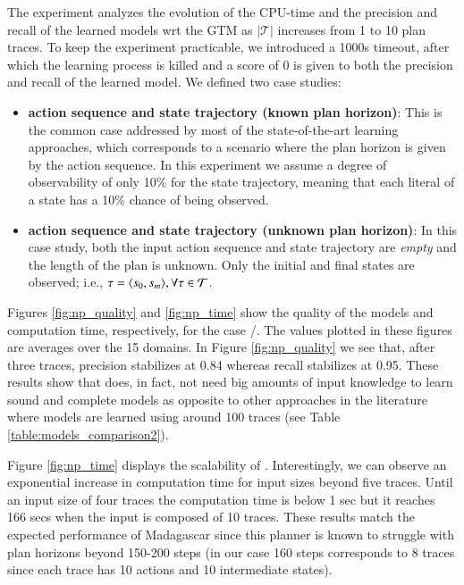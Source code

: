 The experiment analyzes the evolution of the CPU-time and the precision and recall of the learned models wrt the GTM as $|\mathcal{T}|$ increases from 1 to 10 plan traces. To keep the experiment practicable, we introduced a 1000s timeout, after which the learning process is killed and a score of $0$ is given to both the precision and recall of the learned model. We defined two case studies:

\begin{itemize}
	\item \textbf{\FO action sequence and \PO state trajectory (known plan horizon)}: This is the common case addressed by most of the state-of-the-art learning approaches, which corresponds to a scenario where the plan horizon is given by the action sequence. In this experiment we assume a degree of observability of only 10\% for the state trajectory, meaning that each literal of a state has a 10\% chance of being observed.
	\item  \textbf{\NO action sequence and \NO state trajectory (unknown plan horizon)}: In this case study, both the input action sequence and state trajectory are {\em empty} and the length of the plan is unknown. Only the initial and final states are observed; i.e., $\tau = {\langle s_0, s_m \rangle}, \forall \tau \in \mathcal{T}$.
\end{itemize}

Figures \ref{fig:np_quality} and \ref{fig:np_time} show the quality of the models and computation time, respectively, for the case \FO/\PO. The values plotted in these figures are averages over the 15 domains. In Figure \ref{fig:np_quality} we see that, after three traces, precision stabilizes at 0.84 whereas recall stabilizes at 0.95. These results show that \FAMA does, in fact, not need big amounts of input knowledge to learn sound and complete models as opposite to other approaches in the literature where models are learned using around 100 traces (see Table \ref{table:models_comparison2}).

Figure \ref{fig:np_time} displays the scalability of \FAMA. Interestingly, we can observe an exponential increase in computation time for input sizes beyond five traces. Until an input size of four traces the computation time is below 1 sec but it reaches 166 secs when the input is composed of 10 traces. These results match the expected performance of {\sc Madagascar} since this planner is known to struggle with plan horizons beyond 150-200 steps (in our case 160 steps corresponds to 8 traces since each trace has 10 actions and 10 intermediate states).

